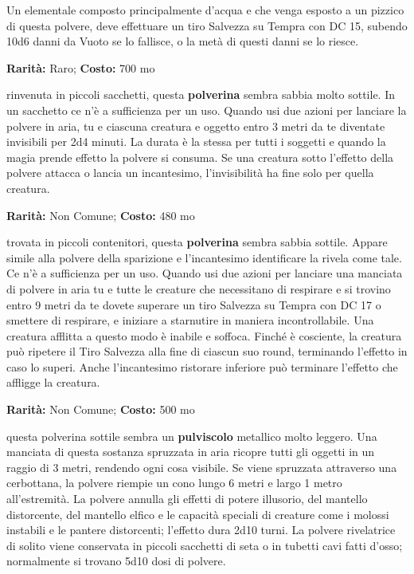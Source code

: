 \begin{multicols}{2}
Un elementale composto principalmente d'acqua e che venga esposto a un pizzico di questa polvere, deve effettuare un tiro Salvezza su Tempra con DC 15, subendo 10d6 danni da Vuoto se lo fallisce, o la metà di questi danni se lo riesce.


\textbf{Rarità:} Raro; \textbf{Costo:} 700 mo

rinvenuta in piccoli sacchetti, questa \textbf{polverina} sembra sabbia molto sottile. In un sacchetto ce n'è a sufficienza per un uso. Quando usi due azioni per lanciare la polvere in aria, tu e ciascuna creatura e oggetto entro 3 metri da te diventate invisibili per 2d4 minuti. La durata è la stessa per tutti i soggetti e quando la magia prende effetto la polvere si consuma. Se una creatura sotto l'effetto della polvere attacca o lancia un incantesimo, l'invisibilità ha fine solo per quella creatura.


\textbf{Rarità:} Non Comune; \textbf{Costo:} 480 mo

trovata in piccoli contenitori, questa \textbf{polverina} sembra sabbia sottile. Appare simile alla polvere della sparizione e l'incantesimo identificare la rivela come tale. Ce n'è a sufficienza per un uso. Quando usi due azioni per lanciare una manciata di polvere in aria tu e tutte le creature che necessitano di respirare e si trovino entro 9 metri da te dovete superare un tiro Salvezza su Tempra con DC 17 o smettere di respirare, e iniziare a starnutire in maniera incontrollabile. Una creatura afflitta a questo modo è inabile e soffoca. Finché è cosciente, la creatura può ripetere il Tiro Salvezza alla fine di ciascun suo round, terminando l'effetto in caso lo superi. Anche l'incantesimo ristorare inferiore può terminare l'effetto che affligge la creatura.


\textbf{Rarità:} Non Comune; \textbf{Costo:} 500 mo

questa polverina sottile sembra un \textbf{pulviscolo} metallico molto leggero. Una manciata di questa sostanza spruzzata in aria ricopre tutti gli oggetti in un raggio di 3 metri, rendendo ogni cosa visibile. Se viene spruzzata attraverso una cerbottana, la polvere riempie un cono lungo 6 metri e largo 1 metro all'estremità. La polvere annulla gli effetti di potere illusorio, del mantello distorcente, del mantello elfico e le capacità speciali di creature come i molossi instabili e le pantere distorcenti; l'effetto dura 2d10 turni. La polvere rivelatrice di solito viene conservata in piccoli sacchetti di seta o in tubetti cavi fatti d'osso; normalmente si trovano 5d10 dosi di polvere.


\end{multicols}
